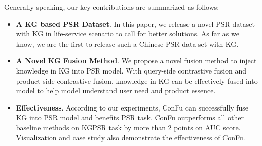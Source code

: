 Generally speaking, our key contributions are summarized as follows: 

\begin{itemize}
    \item \textbf{A KG based PSR Dataset}. In this paper, we release a novel PSR dataset with KG in life-service scenario to call for better solutions. As far as we know, we are the first to release such a Chinese PSR data set with KG. 
    \item \textbf{A Novel KG Fusion Method}. We propose a novel fusion method to inject knowledge in KG into PSR model. With query-side contrastive fusion and product-side contrastive fusion, knowledge in KG can be effectively fused into model to help model understand user need and product essence.
    \item \textbf{Effectiveness}. According to our experiments, ConFu can successfully fuse KG into PSR model and benefits PSR task. ConFu outperforms all other baseline methods on KGPSR task by more than 2 points on AUC score. Visualization and case study also demonstrate the effectiveness of ConFu. 
\end{itemize}


